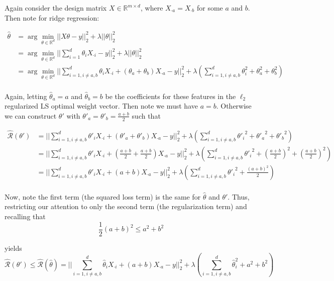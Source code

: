 \documentclass[paper=a4, fontsize=11pt]{scrartcl} %
\numberwithin{equation}{section} %
\numberwithin{figure}{section} %
\numberwithin{table}{section} %
\begin{document}
Again consider the design matrix $X \in \mathbb{R}^{m \times d}$, where $X_{\cdot a} = X_{\cdot b}$ for some $a$ and $b$.  Then note for ridge regression:

\begin{align*}
\hat{\theta} &= \arg \min_{\theta \in \mathbb{R}^d} ||X\theta - y||_2^2 + \lambda ||\theta||_2^2 \\
	&= \arg \min_{\theta \in \mathbb{R}^d} ||\sum_{i=1}^d \theta_i X_{\cdot i} - y||_2^2 + \lambda ||\theta||_2^2 \\
	&= \arg \min_{\theta \in \mathbb{R}^d} ||\sum_{i=1, i \ne a, b}^d \theta_i X_{\cdot i} +  (\theta_a  + \theta_b) X_{\cdot a}- y||_2^2 + \lambda \left(\sum_{i=1, i \ne a, b}^d \theta_i^2 + \theta_a^2 + \theta_b^2 \right)  \\
\end{align*}

Again, letting $\hat{\theta}_{a} = a$ and $\hat{\theta}_{b} = b$ be the coefficients for these features in the $\ell_2$ regularized LS optimal weight vector. Then note we must have $a = b$. Otherwise we can construct $\theta'$ with $\theta'_a = \theta'_b = \frac{a+b}{2}$ such that 

\begin{align*}
\mathcal{\hat{R}}(\theta') &= ||\sum_{i=1, i \ne a, b}^d \theta'_i X_{\cdot i} +  (\theta'_a  + \theta'_b) X_{\cdot a}- y||_2^2 + \lambda \left(\sum_{i=1, i \ne a, b}^d {\theta'_i}^2 +  {\theta'_a}^2 + {\theta'_b}^2 \right) \\
&= ||\sum_{i=1, i \ne a, b}^d \theta'_i X_{\cdot i} +  \left(\frac{a+b}{2}  + \frac{a+b}{2}\right) X_{\cdot a}- y||_2^2 + \lambda \left(\sum_{i=1, i \ne a, b}^d  {\theta'_i}^2 +\left(\frac{a+b}{2}\right)^2 +\left(\frac{a+b}{2}\right)^2 \right) \\
&= ||\sum_{i=1, i \ne a, b}^d \theta'_i X_{\cdot i} +  (a+b) X_{\cdot a}- y||_2^2 + \lambda \left(\sum_{i=1, i \ne a, b}^d  {\theta'_i}^2 +\frac{(a+b)^2}{2} \right) \\
\end{align*}

Now, note the first term (the squared loss term) is the same for $\hat{\theta}$ and $\theta'$. Thus, restricting our attention to only the second term (the regularization term) and recalling that
\[ \frac{1}{2}(a+b)^2 \leq a^2 + b^2\]

yields
\[ \mathcal{\hat{R}}(\theta') \leq \mathcal{\hat{R}}(\hat{\theta}) =  ||\sum_{i=1, i \ne a, b}^d \hat{\theta}_i X_{\cdot i} +  (a  + b) X_{\cdot a}- y||_2^2 + \lambda \left(\sum_{i=1, i \ne a, b}^d \hat{\theta}_i^2 + a^2 + b^2 \right)\]
\end{document}

